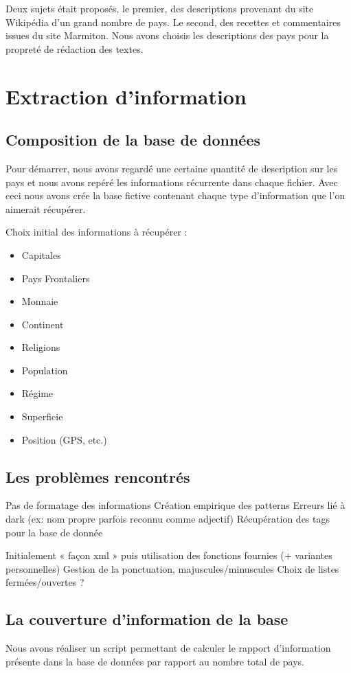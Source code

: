 \documentclass[11pt,a4paper]{article}
\begin{document}
Deux sujets était proposés, le premier, des descriptions provenant du site Wikipédia d'un grand nombre de pays. Le second, des recettes et commentaires issues du site Marmiton. Nous avons choisis les descriptions des pays pour la propreté de rédaction des textes.


\clearpage

\section{Extraction d'information}

\subsection{Composition de la base de données}

Pour démarrer, nous avons regardé une certaine quantité de description sur les pays et nous avons repéré les informations récurrente dans chaque fichier. Avec ceci nous avons crée la base fictive contenant chaque type d'information que l'on aimerait récupérer.

Choix initial des informations à récupérer :
\begin{itemize}
	\item Capitales
	\item Pays Frontaliers
	\item Monnaie
	\item Continent
	\item Religions
	\item Population
	\item Régime
	\item Superficie
	\item Position (GPS, etc.)
\end{itemize}



\subsection{Les problèmes rencontrés}
Pas de formatage des informations
Création empirique des patterns
Erreurs lié à dark (ex: nom propre parfois reconnu comme adjectif)
Récupération des tags pour la base de donnée

Initialement « façon xml » puis utilisation des fonctions fournies (+ variantes
personnelles)
Gestion de la ponctuation, majuscules/minuscules
Choix de listes fermées/ouvertes ?

\subsection{La couverture d'information de la base}
Nous avons réaliser un script permettant de calculer le rapport d'information présente dans la base de données par rapport au nombre total de pays.
\end{document}
